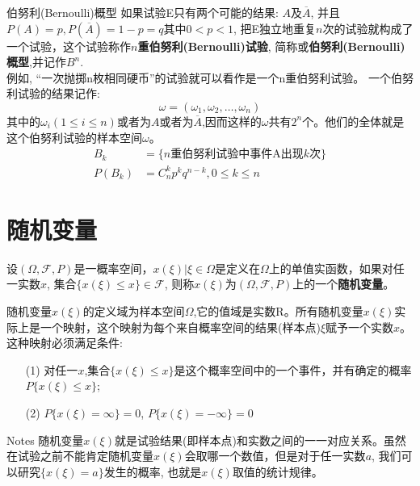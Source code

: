 \begin{frame}{伯努利(Bernoulli)概型}
如果试验E只有两个可能的结果: $A$及$\overline{A}$, 并且$P(A)=p,P(\overline{A})=1-p=q$其中$0<p<1$, 把E独立地重复$n$次的试验就构成了一个试验，这个试验称作\textbf{$n$重伯努利(Bernoulli)试验}, 简称或\textbf{伯努利(Bernoulli)概型},并记作$B^n$.\\
例如, ``一次抛掷n枚相同硬币''的试验就可以看作是一个n重伯努利试验。
一个伯努利试验的结果记作:
$$\omega=(\omega_1,\omega_2,\dots,\omega_n)$$
其中的$\omega_i(1\le i\le n)$或者为$A$或者为$\overline{A}$,因而这样的$\omega$共有$2^n$个。他们的全体就是这个伯努利试验的样本空间$\omega$。
\begin{align*}
B_k &=\{ \text{$n$重伯努利试验中事件A出现$k$次} \}\\
P(B_k)&=C_n^kp^kq^{n-k},0\le k\le n
\end{align*}
\end{frame}

\section{随机变量}

\begin{frame}
\begin{definition}
	设$(\Omega,\mathcal{F},P)$是一概率空间，$x(\xi)|\xi\in\Omega$是定义在$\Omega$上的单值实函数，如果对任一实数$x$, 集合$\{x(\xi)\le x\}\in\mathcal{F}$, 则称$x(\xi)$为$(\Omega,\mathcal{F},P)$上的一个\textbf{随机变量}。
	
	随机变量$x(\xi)$的定义域为样本空间$\Omega$,它的值域是实数R。所有随机变量$x(\xi)$实际上是一个映射，这个映射为每个来自概率空间的结果(样本点)$\xi$赋予一个实数$x$。这种映射必须满足条件:
	\begin{itemize}
		\item[(1)] 对任一$x$,集合$\{x(\xi)\le x\}$是这个概率空间中的一个事件，并有确定的概率$P\{x(\xi)\le x\}$;
		\item[(2)] $P\{x(\xi)=\infty \}=0$, $P\{x(\xi)=-\infty \}=0$
	\end{itemize}
	\begin{block}{Notes}
		随机变量$x(\xi)$就是试验结果(即样本点)和实数之间的一一对应关系。虽然在试验之前不能肯定随机变量$x(\xi)$会取哪一个数值，但是对于任一实数$a$, 我们可以研究$\{x(\xi)=a \}$发生的概率, 也就是$x(\xi)$取值的统计规律。
	\end{block}
\end{definition}
\end{frame}

